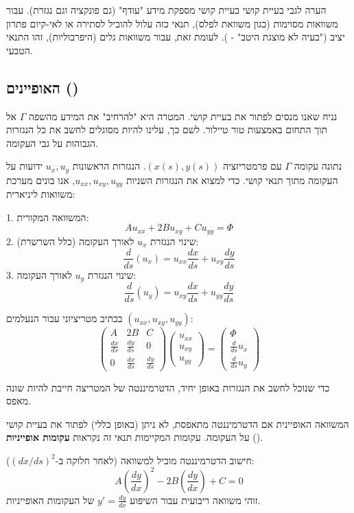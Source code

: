 \begin{notebox}{הערה לגבי בעיית קושי}
    בעיית קושי מספקת מידע "עודף" (גם פונקציה וגם נגזרת). עבור משוואות מסוימות (כגון משוואת לפלס), תנאי כזה עלול להוביל לסתירה או לאי-קיום פתרון יציב ("בעיה לא מוצגת היטב" - ). לעומת זאת, עבור משוואות גלים (היפרבוליות), זהו התנאי הטבעי.
\end{notebox}

\subsection{האופיינים ()}

נניח שאנו מנסים לפתור את בעיית קושי. המטרה היא "להרחיב" את המידע מהשפה $\Gamma$ אל תוך התחום באמצעות טור טיילור. לשם כך, עלינו להיות מסוגלים לחשב את כל הנגזרות הגבוהות על גבי העקומה.

נתונה עקומה $\Gamma$ עם פרמטריזציה $(x(s), y(s))$. הנגזרות הראשונות $u_x, u_y$ ידועות על העקומה מתוך תנאי קושי. כדי למצוא את הנגזרות השניות $u_{xx}, u_{xy}, u_{yy}$, אנו בונים מערכת משוואות ליניארית:

1. המשוואה המקורית:
\[ A u_{xx} + 2B u_{xy} + C u_{yy} = \Phi \]
2. שינוי הנגזרת $u_x$ לאורך העקומה (כלל השרשרת):
\[ \frac{d}{ds}(u_x) = u_{xx} \frac{dx}{ds} + u_{xy} \frac{dy}{ds} \]
3. שינוי הנגזרת $u_y$ לאורך העקומה:
\[ \frac{d}{ds}(u_y) = u_{xy} \frac{dx}{ds} + u_{yy} \frac{dy}{ds} \]

בכתיב מטריציוני עבור הנעלמים $(u_{xx}, u_{xy}, u_{yy})$:
\[
\begin{pmatrix}
A & 2B & C \\
\frac{dx}{ds} & \frac{dy}{ds} & 0 \\
0 & \frac{dx}{ds} & \frac{dy}{ds}
\end{pmatrix}
\begin{pmatrix}
u_{xx} \\ u_{xy} \\ u_{yy}
\end{pmatrix}
=
\begin{pmatrix}
\Phi \\ \frac{d}{ds}u_x \\ \frac{d}{ds}u_y
\end{pmatrix}
\]

כדי שנוכל לחשב את הנגזרות באופן יחיד, הדטרמיננטה של המטריצה חייבת להיות שונה מאפס.

\begin{theorembox}{המשוואה האופיינית}
    אם הדטרמיננטה מתאפסת, לא ניתן (באופן כללי) לפתור את בעיית קושי על העקומה. עקומות המקיימות תנאי זה נקראות \textbf{עקומות אופייניות} ().
    
    חישוב הדטרמיננטה מוביל למשוואה (לאחר חלוקה ב-$(dx/ds)^2$):
    \[ A \left(\frac{dy}{dx}\right)^2 - 2B \left(\frac{dy}{dx}\right) + C = 0 \]
    זוהי משוואה ריבועית עבור השיפוע $y' = \frac{dy}{dx}$ של העקומות האופייניות.
\end{theorembox}

